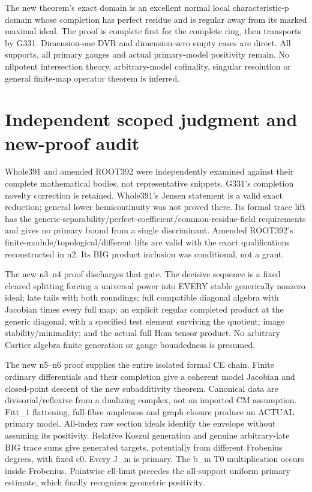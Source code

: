 \documentclass[11pt]{article}
\begin{document}
The new theorem's exact domain is an excellent normal local characteristic-p domain whose completion has perfect residue and is regular away from its marked maximal ideal. The proof is complete first for the complete ring, then transports by G331. Dimension-one DVR and dimension-zero empty cases are direct. All supports, all primary gauges and actual primary-model positivity remain. No nilpotent intersection theory, arbitrary-model cofinality, singular resolution or general finite-map operator theorem is inferred.

\section{Independent scoped judgment and new-proof audit}

Whole391 and amended ROOT392 were independently examined against their complete mathematical bodies, not representative snippets. G331's completion novelty correction is retained. Whole391's Jensen statement is a valid exact reduction; general lower hemicontinuity was not proved there. Its formal trace lift has the generic-separability/perfect-coefficient/common-residue-field requirements and gives no primary bound from a single discriminant. Amended ROOT392's finite-module/topological/different lifts are valid with the exact qualifications reconstructed in n2. Its BIG product inclusion was conditional, not a grant.

The new n3--n4 proof discharges that gate. The decisive sequence is a fixed cleared splitting forcing a universal power into EVERY stable generically nonzero ideal; late tails with both roundings; full compatible diagonal algebra with Jacobian times every full map; an explicit regular completed product at the generic diagonal, with a specified test element surviving the quotient; image stability/minimality; and the actual full Hom tensor product. No arbitrary Cartier algebra finite generation or gauge boundedness is presumed.

The new n5--n6 proof supplies the entire isolated formal CE chain. Finite ordinary differentials and their completion give a coherent model Jacobian and closed-point descent of the new subadditivity theorem. Canonical data are divisorial/reflexive from a dualizing complex, not an imported CM assumption. Fitt\_1 flattening, full-fibre ampleness and graph closure produce an ACTUAL primary model. All-index raw section ideals identify the envelope without assuming its positivity. Relative Koszul generation and genuine arbitrary-late BIG trace sums give generated targets, potentially from different Frobenius degrees, with fixed c0. Every J\_m is primary. The b\_m T0 multiplication occurs inside Frobenius. Pointwise ell-limit precedes the all-support uniform primary estimate, which finally recognizes geometric positivity.
\end{document}
